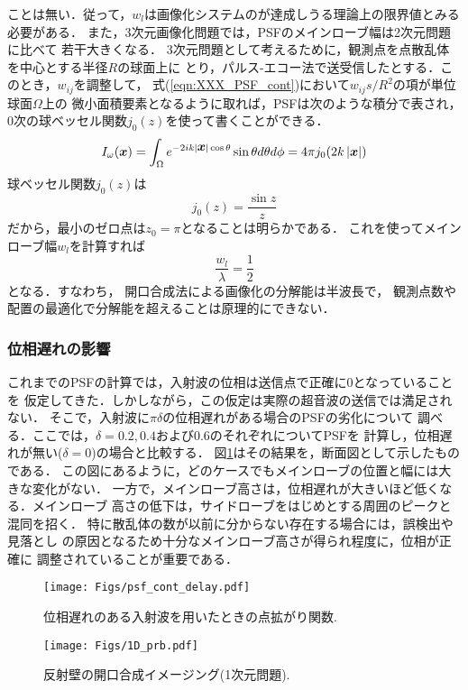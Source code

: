 ことは無い．従って，$w_l$は画像化システムのが達成しうる理論上の限界値とみる必要がある．
また，3次元画像化問題では，PSFのメインローブ幅は2次元問題に比べて
若干大きくなる．
3次元問題として考えるために，観測点を点散乱体を中心とする半径$R$の球面上に
とり，パルス-エコー法で送受信したとする．このとき，$w_{ij}$を調整して，
式(\ref{eqn:XXX_PSF_cont})において$w_{ij}s/R^2$の項が単位球面$\Omega$上の
微小面積要素となるように取れば，PSFは次のような積分で表され，
0次の球ベッセル関数$j_0(z)$を使って書くことができる．
\begin{equation}
	I_\omega(\mbox{\boldmath $x$})
		=
	\int_\Omega
	e^{
	-2ik |\mbox{\boldmath $x$}| \cos \theta
	}
	\sin\theta
	d\theta d\phi
	=
	4\pi j_0(2k\left|\mbox{\boldmath $x$}\right|)
	\label{eqn:XXX_PSF_J0}
\end{equation}
球ベッセル関数$j_0(z)$は
\begin{equation}
	j_0(z)=\frac{\sin z}{z}
\end{equation}	
だから，最小のゼロ点は$z_0=\pi$となることは明らかである．
これを使ってメインローブ幅$w_l$を計算すれば
\begin{equation}
	\frac{w_l}{\lambda}=\frac{1}{2}
	\label{eqn:}
\end{equation}
となる．すなわち， 開口合成法による画像化の分解能は半波長で，
観測点数や配置の最適化で分解能を超えることは原理的にできない．
\subsubsection{位相遅れの影響}
これまでのPSFの計算では，入射波の位相は送信点で正確に0となっていることを
仮定してきた．しかしながら，この仮定は実際の超音波の送信では満足されない．
そこで，入射波に$\pi \delta$の位相遅れがある場合のPSFの劣化について
調べる．ここでは，$\delta=0.2,0.4$および$0.6$のそれぞれについてPSFを
計算し，位相遅れが無い($\delta =0$)の場合と比較する．
図\ref{fig:XXX_psf_cont_delay}はその結果を，断面図として示したものである．
この図にあるように，どのケースでもメインローブの位置と幅には大きな変化がない．
一方で，メインローブ高さは，位相遅れが大きいほど低くなる．メインローブ
高さの低下は，サイドローブをはじめとする周囲のピークと混同を招く．
特に散乱体の数が以前に分からない存在する場合には，誤検出や見落とし
の原因となるため十分なメインローブ高さが得られ程度に，位相が正確に
調整されていることが重要である．
\begin{figure}[h]
	\begin{center}
	\texttt{[image: Figs/psf\_cont\_delay.pdf]} 
	\end{center}
	\caption{位相遅れのある入射波を用いたときの点拡がり関数.} 
	\label{fig:XXX_psf_cont_delay}
\end{figure}
\begin{figure}[h]
	\begin{center}
	\texttt{[image: Figs/1D\_prb.pdf]} 
	\end{center}
	\caption{反射壁の開口合成イメージング(1次元問題).} 
	\label{fig:XXX_1D_prb}
\end{figure}
